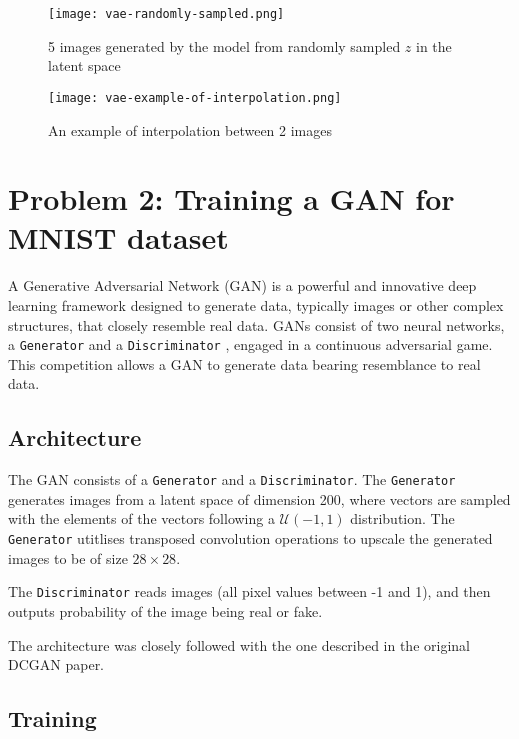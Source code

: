 \documentclass[12pt]{scrartcl}
\begin{document}
    \begin{center}
        \begin{figure}[H]
        \texttt{[image: vae-randomly-sampled.png]}
            \caption{5 images generated by the model from randomly sampled \(z\) in the latent space}
        \end{figure}

        \begin{figure}[H]
            \texttt{[image: vae-example-of-interpolation.png]}
            \caption{An example of interpolation between 2 images}
        \end{figure}
    \end{center}


    \section{Problem 2: Training a GAN for MNIST dataset}

    A Generative Adversarial Network (GAN) is a powerful and innovative deep learning framework designed to generate data, typically images or other complex structures, that closely resemble real data. GANs consist of two neural networks, a \texttt{Generator} and a \texttt{Discriminator} , engaged in a continuous adversarial game. This competition allows a GAN to generate data bearing resemblance to real data.

    \subsection{Architecture}

    The GAN consists of a \texttt{Generator} and a \texttt{Discriminator}. The \texttt{Generator} generates images from a latent space of dimension 200, where vectors are sampled with the elements of the vectors following a \(\mathcal{U}(-1, 1)\) distribution. The \texttt{Generator} utitlises transposed convolution operations to upscale the generated images to be of size \(28\times 28\).

    The \texttt{Discriminator} reads images (all pixel values between -1 and 1), and then outputs probability of the image being real or fake.

    The architecture was closely followed with the one described in the original DCGAN paper.

    \subsection{Training}
\end{document}
